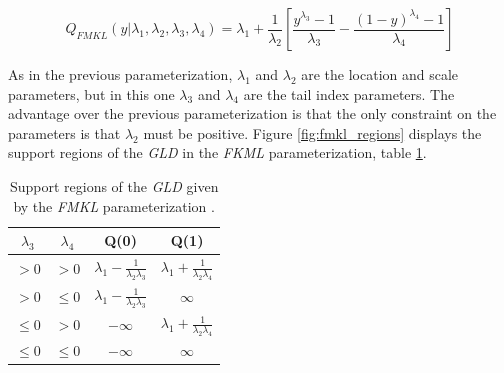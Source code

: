 \begin{equation}\label{eq:fmkl_param}
Q_{FMKL}(y|\lambda_{1}, \lambda_{2}, \lambda_{3}, \lambda_{4})=\lambda_{1}+\frac{1}{\lambda_{2}}\left[\frac{y^{\lambda_{3}}-1}{\lambda_{3}} - \frac{(1-y)^{\lambda_{4}}-1}{\lambda_{4}} \right] 
\end{equation}

As in the previous parameterization, $\lambda_{1}$ and $\lambda_{2}$ are the location and scale parameters, but in this one $\lambda_{3}$ and $\lambda_{4}$ are the tail index parameters. The advantage over the previous parameterization is that the only constraint on the parameters is that $\lambda_{2}$ must be positive. Figure \ref{fig:fmkl_regions} displays the support regions of the \textit{GLD} in the \textit{FKML} parameterization, table \ref{tab:fmkl_conts}.

\begin{table}[H]
\centering
\caption{Support regions of the \textit{GLD} given by the \textit{FMKL} parameterization \cite{Marcondes2018}.}
\label{tab:fmkl_conts}
\begin{tabular}{c|c|c|c}
\hline
$\lambda_{3}$ & $\lambda_{4}$ & Q(0)                                           & Q(1)                                           \\ \hline
$>0$          & $>0$          & $\lambda_{1}-\frac{1}{\lambda_{2}\lambda_{3}}$ & $\lambda_{1}+\frac{1}{\lambda_{2}\lambda_{4}}$ \\ \hline
$>0$          & $\leq0$         & $\lambda_{1}-\frac{1}{\lambda_{2}\lambda_{3}}$ & $\infty$                                       \\ \hline
$\leq0$         & $>0$          & $-\infty$                                      & $\lambda_{1}+\frac{1}{\lambda_{2}\lambda_{4}}$ \\ \hline
$\leq0$         & $\leq0$         & $-\infty$                                      & $\infty$                                       \\ \hline
\end{tabular}
\end{table}

